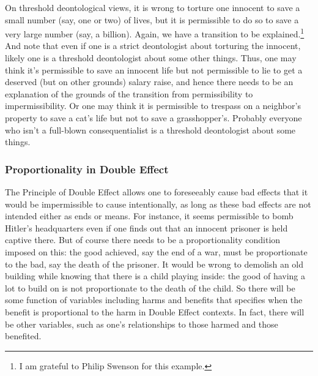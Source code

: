 On threshold deontological views, it is wrong to torture one innocent to save a small number (say, one or two) of lives,
but it is permissible to do so to save a very large number (say, a billion). Again, we have a transition to be 
explained.\footnote{I am grateful to Philip Swenson for this example.} And note that even if one is a strict deontologist
about torturing the innocent, likely one is a threshold deontologist about some other things. Thus, one may think it's
permissible to save an innocent life but not permissible to lie to get a deserved (but on other grounds) salary raise,
and hence there needs to be an explanation of the grounds of the transition from permissibility to impermissibility. Or
one may think it is permissible to trespass on a neighbor's property to save a cat's life but not to save a grasshopper's.
Probably everyone who isn't a full-blown consequentialist is a threshold deontologist about some things.

\subsubsection{Proportionality in Double Effect}
The Principle of Double Effect allows one to foreseeably cause bad effects that it would
be impermissible to cause intentionally, as long as these bad effects are not intended either as ends or means. For instance, it seems permissible to bomb Hitler's headquarters even
if one finds out that an innocent prisoner is held captive there. But of course there needs to be a proportionality
condition imposed on this: the good achieved, say the end of a war, must be proportionate to the bad, say the death of the prisoner. 
It would be wrong to demolish an old building while knowing that there is a child playing inside: the good of having a lot to build
on is not proportionate to the death of the child. So there will be some function of variables including harms and benefits that
specifies when the benefit is proportional to the harm in Double Effect contexts. In fact, there will be other variables, such as
one's relationships to those harmed and those benefited. 

